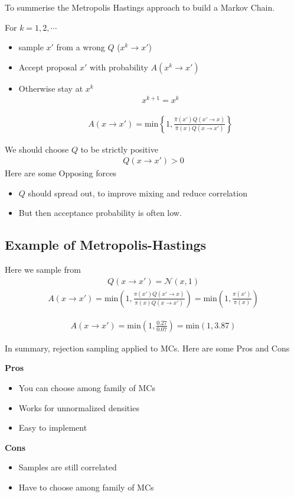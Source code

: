 \documentclass[11pt, oneside, reqno]{amsart}
\numberwithin{equation}{section}
\theoremstyle{plain}%
\theoremstyle{definition}
\theoremstyle{remark}
\begin{document}
To summerise the Metropolis Hastings approach to build a Markov Chain.

For $k=1,2,\cdots$
\begin{itemize}
	\item sample $x'$ from a {\color{red}wrong} $Q$ ($x^k\to x'$)
	\item Accept proposal $x'$ with probability $A(x^k\to x')$
	\item Otherwise stay at $x^k$
	\begin{align*}
		x^{k+1}=x^k
	\end{align*}

\begin{align*}
	A(x\to x')=\text{min}\left\{1,\frac{\hat{\pi}(x')Q(x'\to x)}{\hat{\pi}(x)Q(x\to x')}\right\}
\end{align*}
\end{itemize}
We should choose $Q$ to be strictly positive 
\begin{align*}
	Q(x\to x')>0
\end{align*}
Here are some {\color{red}Opposing forces}
\begin{itemize}
	\item $Q$ should spread out, to improve mixing and reduce correlation
	\item But then acceptance probability is often low.
\end{itemize}
\subsection{Example of Metropolis-Hastings}
Here we sample from 
\begin{align*}
	Q(x\to x')=\mathcal{N}(x,1)
\end{align*}
\begin{align*}
	A(x\to x')=\text{min}\left(1,\frac{\pi(x')Q(x'\to x)}{\pi(x)Q(x\to x')}\right)
	=\text{min}\left(1,\frac{\pi(x')}{\pi(x)}\right)
\end{align*}

\begin{align*}
	A(x\to x')=\text{min}\left(1,\frac{0.27}{0.07}\right)=\text{min}(1,3.87)
\end{align*}

In summary, rejection sampling applied to MCs. Here are some Pros and Cons

\textbf{Pros}
\begin{itemize}
	\item You can choose among family of MCs
	\item Works for unnormalized densities
	\item Easy to implement
\end{itemize}
\textbf{Cons}
\begin{itemize}
	\item Samples are still correlated
	\item Have to choose among family of MCs
\end{itemize}
\end{document}
